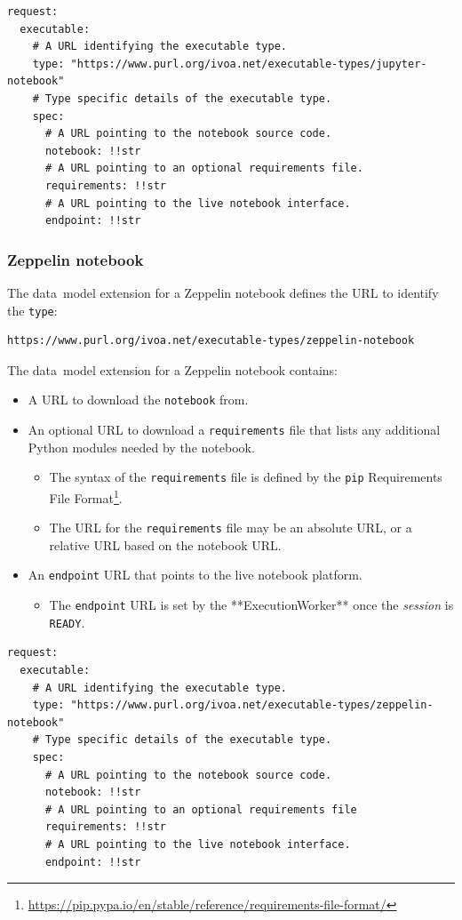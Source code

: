 \documentclass[11pt,a4paper]{ivoa}
\newcommand{\datamodel} {data~model}
\newcommand{\execworkerclass} {**ExecutionWorker**}
\newcommand{\workerjob}[1] {\textit{session#1}}
\newcommand{\python} {Python}
\newcommand{\zeppelin} {Zeppelin}
\newcommand{\codeword}[1] {\texttt{#1}}
\newcommand{\footurl}[1] {\footnote{\url{#1}}}
\begin{document}
\begin{lstlisting}[]
request:
  executable:
    # A URL identifying the executable type.
    type: "https://www.purl.org/ivoa.net/executable-types/jupyter-notebook"
    # Type specific details of the executable type.
    spec:
      # A URL pointing to the notebook source code.
      notebook: !!str
      # A URL pointing to an optional requirements file.
      requirements: !!str
      # A URL pointing to the live notebook interface.
      endpoint: !!str
\end{lstlisting}

\subsubsection{Zeppelin notebook}
\label{subsub-datamodel-zeppelin-notebook}

The \datamodel{} extension for a \zeppelin{} notebook defines the URL
to identify the \codeword{type}:
\begin{lstlisting}[]
https://www.purl.org/ivoa.net/executable-types/zeppelin-notebook
\end{lstlisting}
\hfill \break
The \datamodel{} extension for a \zeppelin{} notebook contains:
\begin{itemize}
    \item A URL to download the \codeword{notebook} from.
    \item An optional URL to download a \codeword{requirements} file that lists any additional
    \python{} modules needed by the notebook.
    \begin{itemize}
        \item The syntax of the \codeword{requirements} file is defined by the \codeword{pip}
        Requirements File Format\footurl{https://pip.pypa.io/en/stable/reference/requirements-file-format/}.
        \item The URL for the \codeword{requirements} file may be an absolute URL, or a relative URL based on the notebook URL.
    \end{itemize}
    \item An \codeword{endpoint} URL that points to the live notebook platform.
    \begin{itemize}
        \item The \codeword{endpoint} URL is set by the \execworkerclass{} once the \workerjob{} is \codeword{READY}.
    \end{itemize}
\end{itemize}

\begin{lstlisting}[]
request:
  executable:
    # A URL identifying the executable type.
    type: "https://www.purl.org/ivoa.net/executable-types/zeppelin-notebook"
    # Type specific details of the executable type.
    spec:
      # A URL pointing to the notebook source code.
      notebook: !!str
      # A URL pointing to an optional requirements file
      requirements: !!str
      # A URL pointing to the live notebook interface.
      endpoint: !!str
\end{lstlisting}
\end{document}
